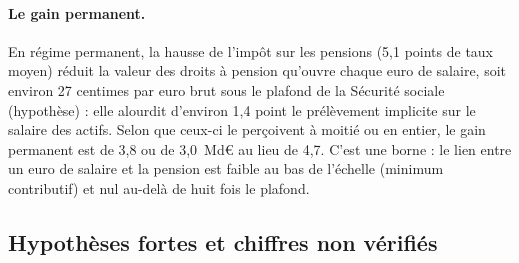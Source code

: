 \documentclass[11pt,a4paper]{article}
\begin{document}
\paragraph{Le gain permanent.} En régime permanent, la hausse de l'impôt sur les pensions (5,1 points de taux moyen)
réduit la valeur des droits à pension qu'ouvre chaque euro de salaire, soit environ 27 centimes par euro brut sous le
plafond de la Sécurité sociale (hypothèse) : elle alourdit d'environ 1,4 point le prélèvement implicite sur le salaire
des actifs. Selon que ceux-ci le perçoivent à moitié ou en entier, le gain permanent est de 3,8 ou de 3,0~Md€ au lieu de
4,7. C'est une borne : le lien entre un euro de salaire et la pension est faible au bas de l'échelle (minimum
contributif) et nul au-delà de huit fois le plafond.

\subsection{Hypothèses fortes et chiffres non vérifiés}
\end{document}
